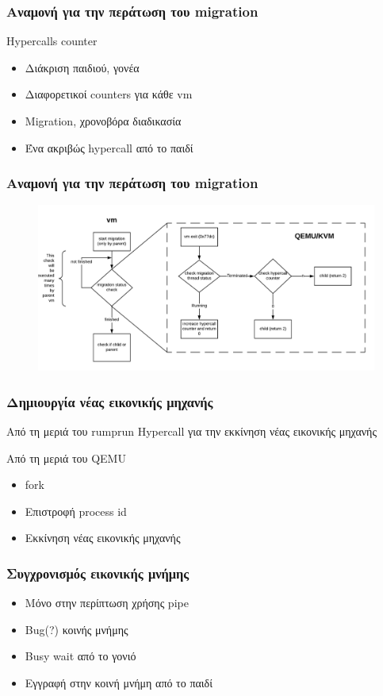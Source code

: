 \documentclass[red,slidestop,notes,compress,mathserif]{beamer}
\begin{document}
\begin{frame}
\frametitle{Αναμονή για την περάτωση του migration}
\begin{block}{Hypercalls counter}
\begin{itemize}
\item Διάκριση παιδιού, γονέα
\item Διαφορετικοί counters για κάθε vm
\item Migration, χρονοβόρα διαδικασία
\item Ένα ακριβώς hypercall από το παιδί
\end{itemize}
\end{block}
\end{frame}

\begin{frame}
\frametitle{Αναμονή για την περάτωση του migration}
\begin{figure}
\center
\includegraphics[scale=0.57]{figures/check_migration_status.png}
\end{figure}
\end{frame}

\begin{frame}
\frametitle{Δημιουργία νέας εικονικής μηχανής}
\begin{block}{Από τη μεριά του rumprun}
Hypercall για την εκκίνηση νέας εικονικής μηχανής
\end{block}
\begin{block}{Από τη μεριά του QEMU}
\begin{itemize}
\item fork 
\item Επιστροφή process id 
\item Εκκίνηση νέας εικονικής μηχανής 
\end{itemize}
\end{block}
\end{frame}

\begin{frame}
\frametitle{Συγχρονισμός εικονικής μνήμης}
\begin{itemize}
\item Μόνο στην περίπτωση χρήσης pipe
\item Bug(?) κοινής μνήμης
\item Busy wait από το γονιό
\item Εγγραφή στην κοινή μνήμη από το παιδί
\end{itemize}
\end{frame}
\end{document}
